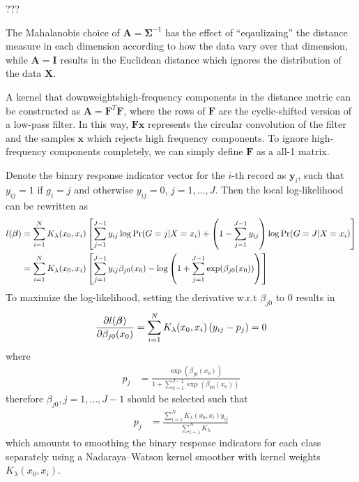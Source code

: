 \begin{exercise}
  ???
\end{exercise}

\begin{exercise}
  The Mahalanobis choice of $\mathbf{A} = \mathbf{\Sigma}^{-1}$ has the effect
  of ``eqaulizaing'' the distance measure in each dimension according to how the
  data vary over that dimension, while $\mathbf{A} = \mathbf{I}$ results in the
  Euclidean distance which ignores the distribution of the data $\mathbf{X}$.
  
  A kernel that downweightshigh-frequency components in the
  distance metric can be constructed as $\mathbf{A} = \mathbf{F}^T\mathbf{F}$,
  where the rows of $\mathbf{F}$ are the cyclic-shifted version of a low-pass
  filter. In this way, $\mathbf{Fx}$ represents the circular convolution of the
  filter and the samples $\mathbf{x}$ which rejects high frequency components.
  To ignore high-frequency components completely, we can simply define
  $\mathbf{F}$ as a all-1 matrix.
\end{exercise}

\begin{exercise}
  Denote the binary response indicator vector for the $i$-th record as
  $\mathbf{y}_i$, such that $y_{ij}=1$ if $g_i=j$ and otherwise $y_{ij}=0$,
  $j=1,\ldots,J$. Then the local log-likelihood can be rewritten as
  \begin{align}
    l(\bm{\beta}) &= \sum_{i=1}^N K_{\lambda}(x_0, x_i)
    \left[\sum_{j=1}^{J-1}y_{ij}\log\mbox{Pr}(G=j|X=x_i)  +
    \left(1-\sum_{j=1}^{J-1}y_{ij}\right) \log\mbox{Pr}(G=J|X=x_i) \right]
    \notag\\ &=
    \sum_{i=1}^N K_{\lambda}(x_0, x_i)
    \left[\sum_{j=1}^{J-1}y_{ij}\beta_{j0}(x_0)
    -\log\left(1+\sum_{j=1}^{J-1} \exp(\beta_{j0}(x_0)) \right) \right]
  \end{align} 
  To maximize the log-likelihood, setting the derivative w.r.t $\beta_{j0}$ to 0
  results in
  \begin{align}
    \pdv{l(\bm{\beta})}{\beta_{j0}(x_0)} = \sum_{i=1}^N K_{\lambda}(x_0,
    x_i)\left(y_{ij} - p_j\right) = 0
  \end{align}
  where
  \begin{align}
    p_j &= \frac{\exp(\beta_{j0}(x_0))}{1 + \sum_{k=1}^{J-1}
    \exp(\beta_{k0}(x_0))}
  \end{align}
  therefore $\beta_{j0}, j=1,\ldots,J-1$ should be selected such that
  \begin{align}
    p_j &= \frac{\sum_{i=1}^N K_{\lambda}(x_0,x_i)y_{ij}} {\sum_{i=1}^N
    K_{\lambda}}
  \end{align}
  which amounts to smoothing the binary response indicators for each class
  separately using a Nadaraya–Watson kernel smoother with kernel weights
  $K_{\lambda}(x_0,x_i)$.
\end{exercise}

